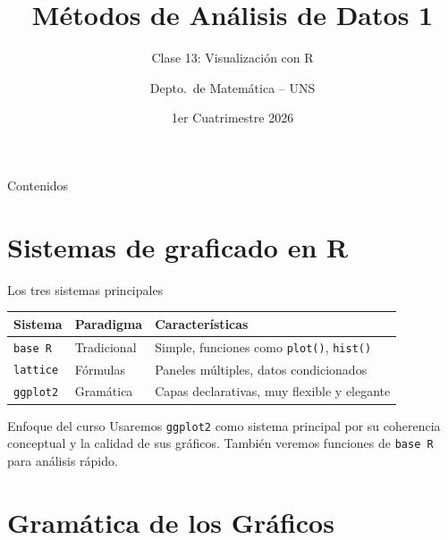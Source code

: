 \documentclass[aspectratio=169]{beamer}
\title{Métodos de Análisis de Datos 1}
\subtitle{Clase 13: Visualización con R}
\author{Depto.\ de Matemática -- UNS}
\institute{Universidad Nacional del Sur}
\date{1er Cuatrimestre 2026}
\begin{document}
\begin{frame}
  \titlepage
\end{frame}

\begin{frame}{Contenidos}
  \tableofcontents
\end{frame}

\section{Sistemas de graficado en R}

\begin{frame}{Los tres sistemas principales}
  \begin{center}
    \begin{tabular}{lll}
      \toprule
      \textbf{Sistema} & \textbf{Paradigma} & \textbf{Características} \\
      \midrule
      \texttt{base R} & Tradicional & Simple, funciones como \texttt{plot()}, \texttt{hist()} \\
      \texttt{lattice} & Fórmulas & Paneles múltiples, datos condicionados \\
      \texttt{ggplot2} & Gramática & Capas declarativas, muy flexible y elegante \\
      \bottomrule
    \end{tabular}
  \end{center}
  \bigskip
  \begin{block}{Enfoque del curso}
    Usaremos \texttt{ggplot2} como sistema principal por su coherencia conceptual y la calidad de sus gráficos. También veremos funciones de \texttt{base R} para análisis rápido.
  \end{block}
\end{frame}

\section{Gramática de los Gráficos}
\end{document}
